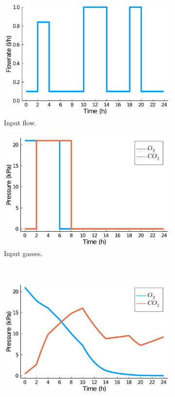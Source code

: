 \begin{figure}[H]
	\centering
	\begin{subfigure}[b]{0.45\textwidth}
		\includegraphics[width=1.0\textwidth]{figure/paper 2/l12_input_flow.pdf}
		\caption{Input flow.}
		\label{figlocala}
	\end{subfigure}
	\begin{subfigure}[b]{0.45\textwidth}
		\centering
		\includegraphics[width=1.0\textwidth]{figure/paper 2/l12_input_gass.pdf}
		\caption{Input gasses.}
		\label{figlocalb}
	\end{subfigure}
	\\
	\begin{subfigure}{0.45\textwidth}
		\centering
		\includegraphics[width=1.0\textwidth]{figure/paper 2/l12_output.pdf}

\end{subfigure}
\end{figure}
